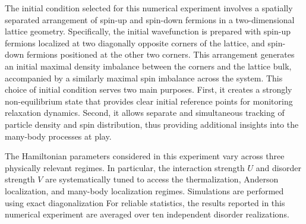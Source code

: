 The initial condition selected for this numerical experiment involves a spatially separated arrangement of spin-up and spin-down fermions in a two-dimensional lattice geometry. Specifically, the initial wavefunction is prepared with spin-up fermions localized at two diagonally opposite corners of the lattice, and spin-down fermions positioned at the other two corners. This arrangement generates an initial maximal density imbalance between the corners and the lattice bulk, accompanied by a similarly maximal spin imbalance across the system. This choice of initial condition serves two main purposes. First, it creates a strongly non-equilibrium state that provides clear initial reference points for monitoring relaxation dynamics. Second, it allows separate and simultaneous tracking of particle density and spin distribution, thus providing additional insights into the many-body processes at play.

The Hamiltonian parameters considered in this experiment vary across three physically relevant regimes. In particular, the interaction strength $U$ and disorder strength $V$ are systematically tuned to access the thermalization, Anderson localization, and many-body localization regimes. Simulations are performed using exact diagonalization 
For reliable statistics, the results reported in this numerical experiment are averaged over ten independent disorder realizations.



